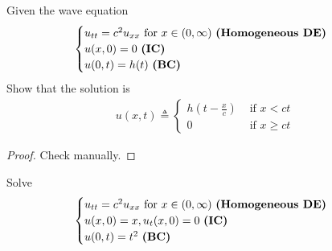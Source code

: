 \documentclass{report}
\begin{document}
\begin{question}{}{}
Given the wave equation 
\begin{align*}
\begin{cases}
  u_{tt}=c^2u_{xx}\text{ for $x\in (0,\infty)$ \textbf{(Homogeneous DE)} }\\
  u(x,0)=0\text{ \textbf{(IC)} }\\
  u(0,t)=h(t)\text{ \textbf{(BC)} }
\end{cases}
\end{align*}
Show that the solution is 
\begin{align*}
u(x,t)\triangleq \begin{cases}
  h(t- \frac{x}{c})& \text{ if $x<ct$ }\\
  0& \text{ if $x\geq ct$ }
\end{cases}
\end{align*}
\end{question}
\begin{proof}
Check manually. 
\end{proof}
\begin{question}{}{}
Solve 
\begin{align*}
\begin{cases}
  u_{tt}=c^2u_{xx}\text{ for }x\in (0,\infty)\text{ \textbf{(Homogeneous DE)} } \\
  u(x,0)=x,u_t(x,0)=0\text{ \textbf{(IC)} }\\
  u(0,t)=t^2\text{ \textbf{(BC)} }
\end{cases}
\end{align*}
\end{question}
\end{document}
